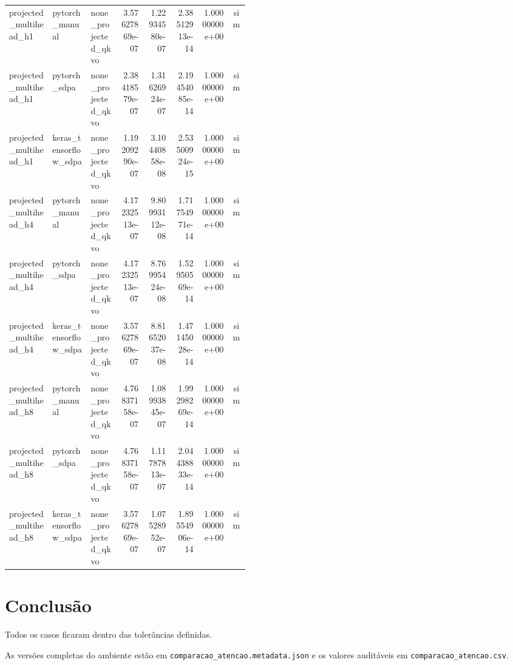 \begin{landscape}
\begin{longtable}{@{}p{0.18\linewidth}p{0.16\linewidth}p{0.12\linewidth}rrrrc@{}}
projected\_\allowbreak{}multihead\_\allowbreak{}h1 & pytorch\_\allowbreak{}manual & none\_\allowbreak{}projected\_\allowbreak{}qkvo & 3.57627869e-07 & 1.22934580e-07 & 2.38512913e-14 & 1.00000000e+00 & sim \\
projected\_\allowbreak{}multihead\_\allowbreak{}h1 & pytorch\_\allowbreak{}sdpa & none\_\allowbreak{}projected\_\allowbreak{}qkvo & 2.38418579e-07 & 1.31626924e-07 & 2.19454085e-14 & 1.00000000e+00 & sim \\
projected\_\allowbreak{}multihead\_\allowbreak{}h1 & keras\_\allowbreak{}tensorflow\_\allowbreak{}sdpa & none\_\allowbreak{}projected\_\allowbreak{}qkvo & 1.19209290e-07 & 3.10440858e-08 & 2.53500924e-15 & 1.00000000e+00 & sim \\
projected\_\allowbreak{}multihead\_\allowbreak{}h4 & pytorch\_\allowbreak{}manual & none\_\allowbreak{}projected\_\allowbreak{}qkvo & 4.17232513e-07 & 9.80993112e-08 & 1.71754971e-14 & 1.00000000e+00 & sim \\
projected\_\allowbreak{}multihead\_\allowbreak{}h4 & pytorch\_\allowbreak{}sdpa & none\_\allowbreak{}projected\_\allowbreak{}qkvo & 4.17232513e-07 & 8.76995424e-08 & 1.52950569e-14 & 1.00000000e+00 & sim \\
projected\_\allowbreak{}multihead\_\allowbreak{}h4 & keras\_\allowbreak{}tensorflow\_\allowbreak{}sdpa & none\_\allowbreak{}projected\_\allowbreak{}qkvo & 3.57627869e-07 & 8.81652037e-08 & 1.47145028e-14 & 1.00000000e+00 & sim \\
projected\_\allowbreak{}multihead\_\allowbreak{}h8 & pytorch\_\allowbreak{}manual & none\_\allowbreak{}projected\_\allowbreak{}qkvo & 4.76837158e-07 & 1.08993845e-07 & 1.99298269e-14 & 1.00000000e+00 & sim \\
projected\_\allowbreak{}multihead\_\allowbreak{}h8 & pytorch\_\allowbreak{}sdpa & none\_\allowbreak{}projected\_\allowbreak{}qkvo & 4.76837158e-07 & 1.11787813e-07 & 2.04438833e-14 & 1.00000000e+00 & sim \\
projected\_\allowbreak{}multihead\_\allowbreak{}h8 & keras\_\allowbreak{}tensorflow\_\allowbreak{}sdpa & none\_\allowbreak{}projected\_\allowbreak{}qkvo & 3.57627869e-07 & 1.07528952e-07 & 1.89554906e-14 & 1.00000000e+00 & sim \\
\bottomrule
\end{longtable}
\end{landscape}

\section{Conclusão}

Todos os casos ficaram dentro das tolerâncias definidas.

As versões completas do ambiente estão em \texttt{comparacao\_atencao.metadata.json} e os valores auditáveis em \texttt{comparacao\_atencao.csv}.
